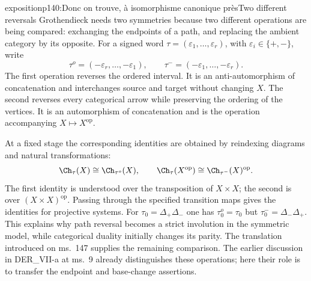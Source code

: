 \begin{dcomment}{exposition}{p140:Donc on trouve, à isomorphisme canonique près}{Two different reversals}
Grothendieck needs two symmetries because two different operations are being compared: exchanging the endpoints of a path, and replacing the ambient category by its opposite. For a signed word $\tau=(\varepsilon_1,\ldots,\varepsilon_r)$, with $\varepsilon_i\in\{+,-\}$, write
\[
 \tau^o=(-\varepsilon_r,\ldots,-\varepsilon_1),
 \qquad
 \tau^-=(-\varepsilon_1,\ldots,-\varepsilon_r).
\]
The first operation reverses the ordered interval. It is an anti-automorphism of concatenation and interchanges source and target without changing $X$. The second reverses every categorical arrow while preserving the ordering of the vertices. It is an automorphism of concatenation and is the operation accompanying $X\mapsto X^{\mathrm{op}}$.

At a fixed stage the corresponding identities are obtained by reindexing diagrams and natural transformations:
\[
 \Ch_\tau(X)\cong\Ch_{\tau^o}(X),
 \qquad
 \Ch_\tau(X^{\mathrm{op}})
          \cong\Ch_{\tau^-}(X)^{\mathrm{op}}.
\]
The first identity is understood over the transposition of $X\times X$; the second is over $(X\times X)^{\mathrm{op}}$. Passing through the specified transition maps gives the identities for projective systems. For $\tau_0=\Delta_+\Delta_-$ one has $\tau_0^o=\tau_0$ but $\tau_0^-=\Delta_-\Delta_+$. This explains why path reversal becomes a strict involution in the symmetric model, while categorical duality initially changes its parity. The translation introduced on ms.~147 supplies the remaining comparison. The earlier discussion in DER\_VII-a at ms.~9 already distinguishes these operations; here their role is to transfer the endpoint and base-change assertions.
\end{dcomment}

